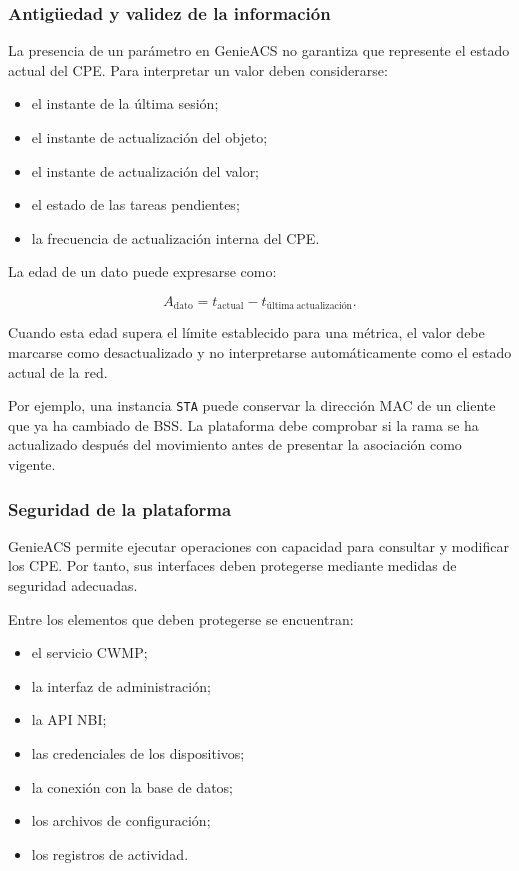 \subsubsection*{Antigüedad y validez de la información}

La presencia de un parámetro en GenieACS no garantiza que represente el
estado actual del CPE. Para interpretar un valor deben considerarse:

\begin{itemize}
    \item el instante de la última sesión;
    \item el instante de actualización del objeto;
    \item el instante de actualización del valor;
    \item el estado de las tareas pendientes;
    \item la frecuencia de actualización interna del CPE.
\end{itemize}

La edad de un dato puede expresarse como:

\[
    A_{\mathrm{dato}}
    =
    t_{\mathrm{actual}}
    -
    t_{\mathrm{última\ actualización}}.
\]

Cuando esta edad supera el límite establecido para una métrica, el valor
debe marcarse como desactualizado y no interpretarse automáticamente como
el estado actual de la red.

Por ejemplo, una instancia \texttt{STA} puede conservar la dirección MAC
de un cliente que ya ha cambiado de BSS. La plataforma debe comprobar si
la rama se ha actualizado después del movimiento antes de presentar la
asociación como vigente.


\subsubsection*{Seguridad de la plataforma}

GenieACS permite ejecutar operaciones con capacidad para consultar y
modificar los CPE. Por tanto, sus interfaces deben protegerse mediante
medidas de seguridad adecuadas.

Entre los elementos que deben protegerse se encuentran:

\begin{itemize}
    \item el servicio CWMP;
    \item la interfaz de administración;
    \item la API NBI;
    \item las credenciales de los dispositivos;
    \item la conexión con la base de datos;
    \item los archivos de configuración;
    \item los registros de actividad.
\end{itemize}

